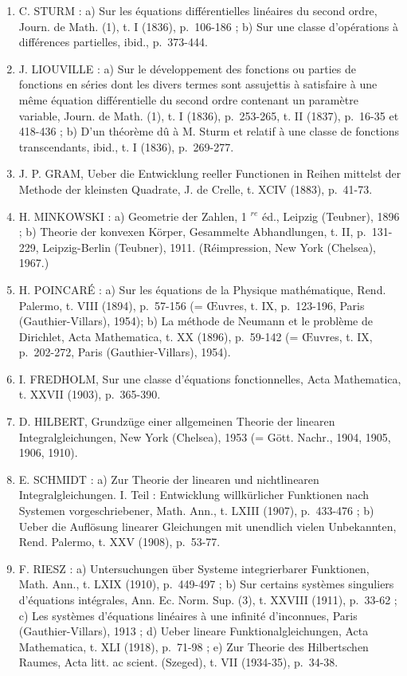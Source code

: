 
\begin{enumerate}
\def\labelenumi{(\Roman{enumi})}
\item
  C. STURM : a) Sur les équations différentielles linéaires du second ordre, Journ. de Math. (1), t. I (1836), p.~106-186 ; b) Sur une classe d'opérations à différences partielles, ibid., p.~373-444.
\item
  J. LIOUVILLE : a) Sur le développement des fonctions ou parties de fonctions en séries dont les divers termes sont assujettis à satisfaire à une même équation différentielle du second ordre contenant un paramètre variable, Journ. de Math. (1), t. I (1836), p.~253-265, t. II (1837), p.~16-35 et 418-436 ; b) D'un théorème dû à M. Sturm et relatif à une classe de fonctions transcendants, ibid., t. I (1836), p.~269-277.
\item
  J. P. GRAM, Ueber die Entwicklung reeller Functionen in Reihen mittelst der Methode der kleinsten Quadrate, J. de Crelle, t. XCIV (1883), p.~41-73.
\item
  H. MINKOWSKI : a) Geometrie der Zahlen, 1 \(^{re}\) éd., Leipzig (Teubner), 1896 ; b) Theorie der konvexen Körper, Gesammelte Abhandlungen, t. II, p.~131-229, Leipzig-Berlin (Teubner), 1911. (Réimpression, New York (Chelsea), 1967.)
\item
  H. POINCARÉ : a) Sur les équations de la Physique mathématique, Rend. Palermo, t. VIII (1894), p.~57-156 (= Œuvres, t. IX, p.~123-196, Paris (Gauthier-Villars), 1954); b) La méthode de Neumann et le problème de Dirichlet, Acta Mathematica, t. XX (1896), p.~59-142 (= Œuvres, t. IX, p.~202-272, Paris (Gauthier-Villars), 1954).
\item
  I. FREDHOLM, Sur une classe d'équations fonctionnelles, Acta Mathematica, t. XXVII (1903), p.~365-390.
\item
  D. HILBERT, Grundzüge einer allgemeinen Theorie der linearen Integralgleichungen, New York (Chelsea), 1953 (= Gött. Nachr., 1904, 1905, 1906, 1910).
\item
  E. SCHMIDT : a) Zur Theorie der linearen und nichtlinearen Integralgleichungen. I. Teil : Entwicklung willkürlicher Funktionen nach Systemen vorgeschriebener, Math. Ann., t. LXIII (1907), p.~433-476 ; b) Ueber die Auflösung linearer Gleichungen mit unendlich vielen Unbekannten, Rend. Palermo, t. XXV (1908), p.~53-77.
\item
  F. RIESZ : a) Untersuchungen über Systeme integrierbarer Funktionen, Math. Ann., t. LXIX (1910), p.~449-497 ; b) Sur certains systèmes singuliers d'équations intégrales, Ann. Ec. Norm. Sup. (3), t. XXVIII (1911), p.~33-62 ; c) Les systèmes d'équations linéaires à une infinité d'inconnues, Paris (Gauthier-Villars), 1913 ; d) Ueber lineare Funktionalgleichungen, Acta Mathematica, t. XLI (1918), p.~71-98 ; e) Zur Theorie des Hilbertschen Raumes, Acta litt. ac scient. (Szeged), t. VII (1934-35), p.~34-38.

\end{enumerate}
